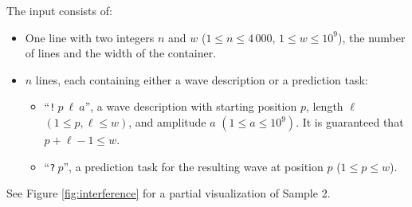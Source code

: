 
  The input consists of:
  \begin{itemize}
    \item One line with two integers $n$ and $w$ ($1 \le n \le 4\,000$, $1 \le w \le 10^{9}$), the number of lines and the width of the container.
    \item $n$ lines, each containing either a wave description or a prediction task:
    \begin{itemize}
      \item ``\texttt{!$~p~\ell~a$}'', a wave description with starting position $p$, length $\ell$ $(1 \le p, \ell \le w)$, and amplitude $a$ $(1 \le a \le 10^9)$.
      It is guaranteed that $p+\ell - 1 \le w$.
      \item ``\texttt{?$~p$}'', a prediction task for the resulting wave at position $p$ ($1 \le p \le w$).
    \end{itemize}
  \end{itemize}
  See Figure \ref{fig:interference} for a partial visualization of Sample 2.
